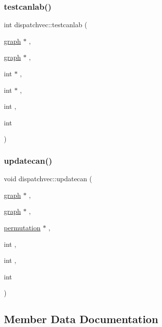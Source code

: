 \mbox{\label{structdispatchvec_a3aafdf8d792c0dc2fdca1b8a1f88a695}} 
\subsubsection{\texorpdfstring{testcanlab()}{testcanlab()}}
{\footnotesize\ttfamily int dispatchvec\+::testcanlab (\begin{DoxyParamCaption}\item[{\mbox{\hyperlink{nauty_8h_a28c08db7c5948ab173e0f0497773f2f1}{graph}} $\ast$}]{,  }\item[{\mbox{\hyperlink{nauty_8h_a28c08db7c5948ab173e0f0497773f2f1}{graph}} $\ast$}]{,  }\item[{int $\ast$}]{,  }\item[{int $\ast$}]{,  }\item[{int}]{,  }\item[{int}]{ }\end{DoxyParamCaption})}

\mbox{\label{structdispatchvec_ad2dc76b9dced1aca091afd886a7e96c3}} 
\subsubsection{\texorpdfstring{updatecan()}{updatecan()}}
{\footnotesize\ttfamily void dispatchvec\+::updatecan (\begin{DoxyParamCaption}\item[{\mbox{\hyperlink{nauty_8h_a28c08db7c5948ab173e0f0497773f2f1}{graph}} $\ast$}]{,  }\item[{\mbox{\hyperlink{nauty_8h_a28c08db7c5948ab173e0f0497773f2f1}{graph}} $\ast$}]{,  }\item[{\mbox{\hyperlink{classpermutation}{permutation}} $\ast$}]{,  }\item[{int}]{,  }\item[{int}]{,  }\item[{int}]{ }\end{DoxyParamCaption})}



\subsection{Member Data Documentation}
\mbox{\label{structdispatchvec_af3df5d60389cfbac3eaa7b03eed08a4f}} 
